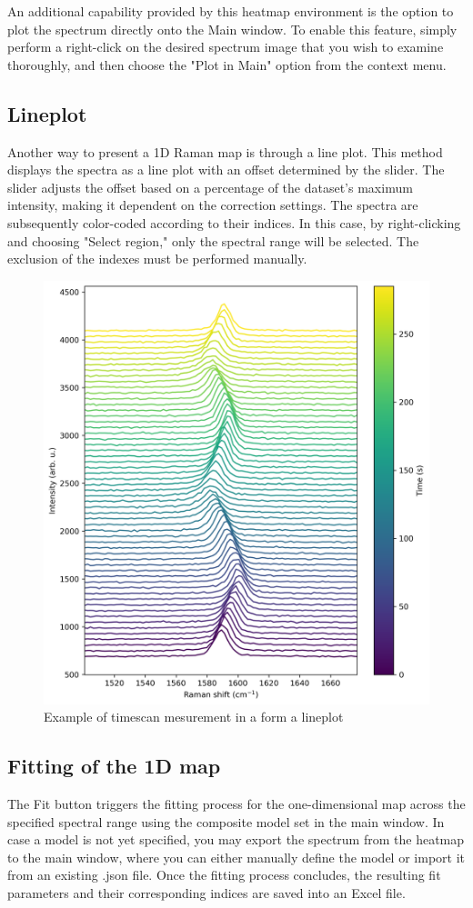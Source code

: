 An additional capability provided by this heatmap environment is the option to plot the spectrum directly onto the Main window. To enable this feature, simply perform a right-click on the desired spectrum image that you wish to examine thoroughly, and then choose the "Plot in Main" option from the context menu.

\subsection{Lineplot}
Another way to present a 1D Raman map is through a line plot. This method displays the spectra as a line plot with an offset determined by the slider. The slider adjusts the offset based on a percentage of the dataset's maximum intensity, making it dependent on the correction settings. The spectra are subsequently color-coded according to their indices. In this case, by right-clicking and choosing "Select region," only the spectral range will be selected. The exclusion of the indexes must be performed manually.

\begin{figure}[H]
    \centering
    \includegraphics[width=0.5\linewidth]{Resources/lineplot_1D.png}
    \caption{Example of timescan mesurement in a form a lineplot}
    \label{lineplot_1D}
\end{figure}

\subsection{Fitting of the 1D map}
The Fit button triggers the fitting process for the one-dimensional map across the specified spectral range using the composite model set in the main window. In case a model is not yet specified, you may export the spectrum from the heatmap to the main window, where you can either manually define the model or import it from an existing .json file. Once the fitting process concludes, the resulting fit parameters and their corresponding indices are saved into an Excel file.

